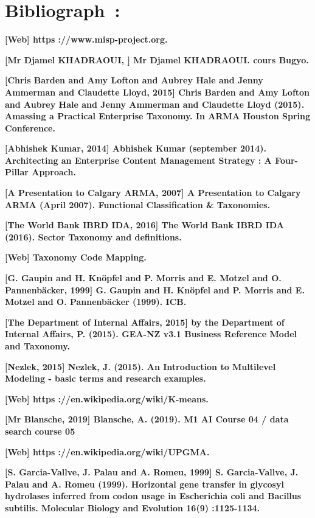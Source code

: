 \documentclass[12pt]{report}
\begin{document}
\section*{Bibliograph : }
\textbf{[Web] https ://www.misp-project.org.}\par
\textbf{[Mr Djamel KHADRAOUI, ] Mr Djamel KHADRAOUI. cours Bugyo.}\par
\textbf{[Chris Barden and Amy Lofton and Aubrey Hale and Jenny Ammerman and Claudette Lloyd, 2015]
Chris Barden and Amy Lofton and Aubrey Hale and Jenny Ammerman and Claudette Lloyd (2015).
Amassing a Practical Enterprise Taxonomy. In ARMA Houston Spring Conference.}\par
\textbf{[Abhishek Kumar, 2014] Abhishek Kumar (september 2014). Architecting an Enterprise Content Management Strategy : A Four-Pillar Approach.}\par
\textbf{[A Presentation to Calgary ARMA, 2007]  A Presentation to Calgary ARMA (April 2007).  Functional Classification & Taxonomies.}\par
\textbf{[The World Bank IBRD IDA, 2016] The World Bank IBRD IDA (2016). Sector Taxonomy and definitions.}\par
\textbf{[Web] Taxonomy Code Mapping.}\par
\textbf{[G. Gaupin and H. Knöpfel and P. Morris and E. Motzel and O. Pannenbäcker, 1999] G. Gaupin and H.
Knöpfel and P. Morris and E. Motzel and O. Pannenbäcker (1999). ICB.}\par
\textbf{[The Department of Internal Affairs, 2015] by the Department of Internal Affairs, P. (2015). GEA-NZ
v3.1 Business Reference Model and Taxonomy.}\par
\textbf{[Nezlek, 2015] Nezlek, J. (2015). An Introduction to Multilevel Modeling - basic terms and research
examples.}\par
\textbf{[Web] https ://en.wikipedia.org/wiki/K-means.}\par
\textbf{[Mr Blansche, 2019] Blansche, A. (2019). M1 AI Course 04 / data search course 05 }\par
\textbf{[Web] https ://en.wikipedia.org/wiki/UPGMA.}\par
\textbf{[S. Garcia-Vallve, J. Palau and A. Romeu, 1999] S. Garcia-Vallve, J. Palau and A. Romeu (1999). Horizontal
gene transfer in glycosyl hydrolases inferred from codon usage in Escherichia coli and Bacillus
subtilis. Molecular Biology and Evolution 16(9) :1125-1134.}\par


\printbibliography
\end{document}
